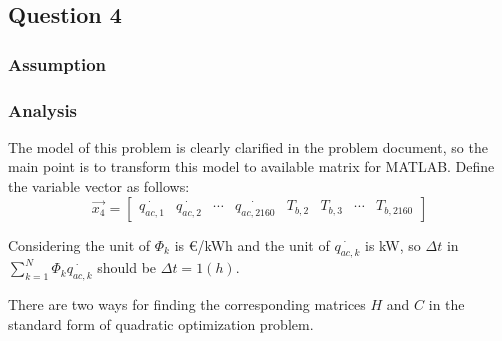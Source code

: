 \documentclass[titlepage,a4paper]{article}
\begin{document}
\fi

    \setlength{\parindent}{0pt}
    \setlength{\parskip}{0.5em}

    \subsection{Question 4}
    

        \subsubsection{Assumption}





        \subsubsection{Analysis}

        The model of this problem is clearly clarified in the problem document, so the main point is to transform this model to available matrix for MATLAB. Define the variable vector as follows:
        $$
        \vec{x_4}=
        \begin{bmatrix}
            \dot{q_{ac,1}} & \dot{q_{ac,2}} & \cdots &\dot{q_{ac,2160}} &T_{b,2} & T_{b,3} & \cdots & T_{b,2160}
        \end{bmatrix} 
        $$

        Considering the unit of $\Phi_k$ is \euro/kWh and the unit of $\dot{q_{ac,k}}$ is kW, so $\Delta t$ in $\sum_{k=1}^N \Phi_k \dot{q_{ac,k}}$ should be $\Delta t = 1 (h)$.

        There are two ways for finding the corresponding matrices $H$ and $C$ in the standard form of quadratic optimization problem.
\end{document}
